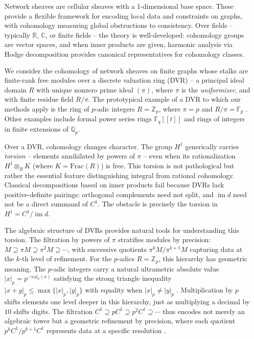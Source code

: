 \documentclass[11pt]{amsart}
\theoremstyle{plain}
\theoremstyle{definition}
\newcommand{\Zp}{\mathbb{Z}_p}                        %
\newcommand{\Qp}{\mathbb{Q}_p}                        %
\newcommand{\valpi}{\mathrm{val}_{\unif}}                   %
\newcommand{\Ring}{R}                          %
\newcommand{\unif}{\pi}                        %
\DeclareMathOperator{\im}{im}                         %
\begin{document}
Network sheaves are cellular sheaves \cite{Curry_SheavesCosheaves_2014} with a 1-dimensional base space.
These provide a flexible framework for encoding local data and 
constraints on graphs, with cohomology measuring global obstructions to 
consistency. Over fields -- typically $\mathbb{R}$, $\mathbb{C}$, or finite 
fields -- the theory is well-developed: cohomology groups are vector spaces, 
and when inner products are given, harmonic analysis via Hodge 
decomposition provides canonical representatives for cohomology classes. 

We consider the cohomology of network sheaves on finite graphs whose stalks are finite-rank 
free modules over a discrete valuation ring (DVR) -- a principal ideal 
domain $\Ring$ with unique nonzero prime ideal $(\unif)$, where $\unif$ is the 
\emph{uniformizer}, and with finite residue field $\Ring/\unif$. 
The prototypical example of a DVR to which our methods apply is the ring of $p$-adic 
integers $\Ring=\Zp$, where $\unif=p$ and $\Ring/\unif=\mathbb{F}_p$ \cite{AtiyahMacdonald_ICA_1969}. 
Other examples include formal power series rings $\mathbb{F}_q[[t]]$ and rings of integers 
in finite extensions of $\Qp$.

Over a DVR, cohomology changes character. The group $H^1$ generically 
carries \emph{torsion} -- elements annihilated by powers of $\unif$ -- even when 
its rationalization $H^1 \otimes_{\Ring} K$ (where $K = \mathrm{Frac}(\Ring)$) is 
free. This torsion is not pathological but rather the essential feature 
distinguishing integral from rational cohomology. Classical decompositions based 
on inner products fail because DVRs lack positive-definite pairings: orthogonal 
complements need not split, and $\im d$ need not be a direct summand of $C^1$. 
The obstacle is precisely the torsion in $H^1 = C^1/\im d$. 

The algebraic structure of DVRs provides natural tools for understanding this 
torsion. The filtration by powers of $\unif$ stratifies modules by precision: 
$M \supseteq \unif M \supseteq \unif^2 M \supseteq \cdots$, with successive 
quotients $\unif^k M/\unif^{k+1}M$ capturing data at the $k$-th level of 
refinement. For the $p$-adics $\Ring = \Zp$, this hierarchy has geometric meaning. The $p$-adic integers carry a natural ultrametric absolute value 
$|x|_p = p^{-\valpi(x)}$ satisfying the strong triangle inequality 
$|x+y|_p \leq \max\{|x|_p,|y|_p\}$ with equality when $|x|_p \neq |y|_p$ \cite{Schikhof1985,Gouva2020}. 
Multiplication by $p$ shifts elements one level deeper in this hierarchy, just 
as multiplying a decimal by $10$ shifts digits. The filtration 
$C^1 \supseteq pC^1 \supseteq p^2C^1 \supseteq \cdots$ thus encodes not merely 
an algebraic tower but a geometric refinement by precision, where each quotient 
$p^kC^1/p^{k+1}C^1$ represents data at a specific resolution \cite{Schikhof1985,Gouva2020,Koblitz1984}.
\end{document}
